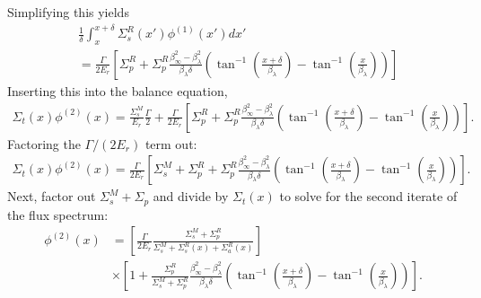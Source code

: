 Simplifying this yields
\begin{align}
  &\frac{1}{\delta} \int_x^{x+\delta} \Sigma_s^R(x') \phi^{(1)}(x') dx' \nonumber \\
  &= \frac{\Gamma}{2E_r} \left[ \Sigma_p^R + \Sigma_p^R \frac{  \beta_\infty^2 - \beta_\lambda^2 }{ \beta_\lambda \delta } 
  \left( \tan^{-1} \left( \frac{x+\delta}{\beta_\lambda} \right) - \tan^{-1} \left( \frac{x}{\beta_\lambda} \right) \right) \right] 
\end{align}
Inserting this into the balance equation,
\begin{align}
  \Sigma_t(x) \phi^{(2)}(x)  = \frac{\Sigma_s^M}{E_r} \frac{\Gamma}{2}
  + \frac{\Gamma}{2E_r} \left[ \Sigma_p^R + \Sigma_p^R \frac{  \beta_\infty^2 - \beta_\lambda^2 }{ \beta_\lambda \delta } 
  \left( \tan^{-1} \left( \frac{x+\delta}{\beta_\lambda} \right) - \tan^{-1} \left( \frac{x}{\beta_\lambda} \right) \right) \right].
\end{align}
Factoring the $\Gamma/(2E_r)$ term out:
\begin{align}
  \Sigma_t(x) \phi^{(2)}(x)  = 
  \frac{\Gamma}{2E_r} \left[ \Sigma_s^M + \Sigma_p^R + \Sigma_p^R \frac{  \beta_\infty^2 - \beta_\lambda^2 }{ \beta_\lambda \delta } 
  \left( \tan^{-1} \left( \frac{x+\delta}{\beta_\lambda} \right) - \tan^{-1} \left( \frac{x}{\beta_\lambda} \right) \right) \right].
\end{align}
Next, factor out $\Sigma_s^M + \Sigma_p$ and divide by $\Sigma_t(x)$ to solve for the second iterate of the flux spectrum:
\begin{align}
  \phi^{(2)}(x)  &= 
  \left[  \frac{\Gamma}{2E_r} \frac{ \Sigma_s^M + \Sigma_p^R }{ \Sigma_s^M + \Sigma_s^R(x) + \Sigma_a^R(x) } \right] \nonumber \\
  &\times \left[ 1 + \frac{\Sigma_p^R}{\Sigma_s^M + \Sigma_p^R } \frac{  \beta_\infty^2 - \beta_\lambda^2 }{ \beta_\lambda \delta } 
  \left( \tan^{-1} \left( \frac{x+\delta}{\beta_\lambda} \right) - \tan^{-1} \left( \frac{x}{\beta_\lambda} \right) \right) \right].
\end{align}

